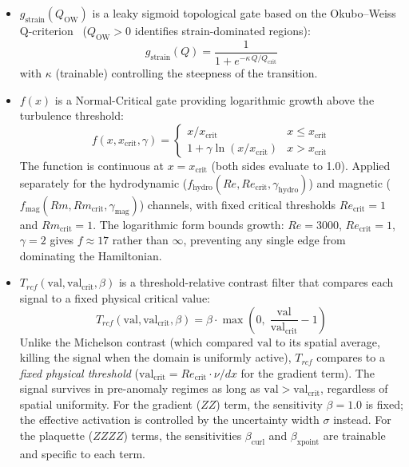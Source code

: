 \documentclass[12pt, a4paper, oneside]{report}
\begin{document}
\begin{itemize}
    \item $g_{\text{strain}}(Q_{\text{OW}})$ is a leaky sigmoid topological gate based on the Okubo--Weiss Q-criterion~\cite{okubo1970, weiss1991} ($Q_{\text{OW}} > 0$ identifies strain-dominated regions):
    \begin{equation}
        g_{\text{strain}}(Q) = \frac{1}{1 + e^{-\kappa \, Q / Q_{\text{crit}}}}
    \end{equation}
    with $\kappa$ (trainable) controlling the steepness of the transition.
    \item $f(x)$ is a Normal-Critical gate providing logarithmic growth above the turbulence threshold:
    \begin{equation}
        f(x, x_{\text{crit}}, \gamma) = \begin{cases} x / x_{\text{crit}} & x \leq x_{\text{crit}} \\ 1 + \gamma \ln(x / x_{\text{crit}}) & x > x_{\text{crit}} \end{cases}
    \end{equation}
    The function is continuous at $x = x_{\text{crit}}$ (both sides evaluate to 1.0). Applied separately for the hydrodynamic ($f_{\text{hydro}}(Re, Re_{\text{crit}}, \gamma_{\text{hydro}})$) and magnetic ($f_{\text{mag}}(Rm, Rm_{\text{crit}}, \gamma_{\text{mag}})$) channels, with fixed critical thresholds $Re_{\text{crit}} = 1$ and $Rm_{\text{crit}} = 1$. The logarithmic form bounds growth: $Re = 3000$, $Re_{\text{crit}} = 1$, $\gamma = 2$ gives $f \approx 17$ rather than $\infty$, preventing any single edge from dominating the Hamiltonian.
    \item $T_{rcf}(\text{val}, \text{val}_{\text{crit}}, \beta)$ is a threshold-relative contrast filter that compares each signal to a fixed physical critical value:
    \begin{equation}
        T_{rcf}(\text{val}, \text{val}_{\text{crit}}, \beta) = \beta \cdot \max\!\left(0,\; \frac{\text{val}}{\text{val}_{\text{crit}}} - 1\right)
    \end{equation}
    Unlike the Michelson contrast (which compared $\text{val}$ to its spatial average, killing the signal when the domain is uniformly active), $T_{rcf}$ compares to a \textit{fixed physical threshold} ($\text{val}_{\text{crit}} = Re_{\text{crit}} \cdot \nu / dx$ for the gradient term). The signal survives in pre-anomaly regimes as long as $\text{val} > \text{val}_{\text{crit}}$, regardless of spatial uniformity. For the gradient ($ZZ$) term, the sensitivity $\beta = 1.0$ is fixed; the effective activation is controlled by the uncertainty width $\sigma$ instead. For the plaquette ($ZZZZ$) terms, the sensitivities $\beta_{\text{curl}}$ and $\beta_{\text{xpoint}}$ are trainable and specific to each term.
\end{itemize}
\end{document}

